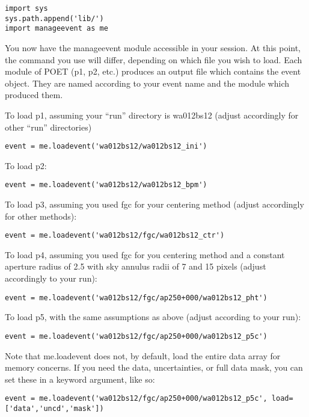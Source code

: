 \documentclass[letterpaper,12pt]{article}
\begin{document}
\begin{verbatim}
import sys
sys.path.append('lib/')
import manageevent as me
\end{verbatim}

You now have the manageevent module accessible in your session. At
this point, the command you use will differ, depending on which file
you wish to load. Each module of POET (p1, p2, etc.) produces an
output file which contains the event object. They are named according
to your event name and the module which produced them.

To load p1, assuming your ``run'' directory is wa012bs12 (adjust accordingly for other ``run'' directories)

\begin{verbatim}
event = me.loadevent('wa012bs12/wa012bs12_ini')
\end{verbatim}

To load p2:

\begin{verbatim}
event = me.loadevent('wa012bs12/wa012bs12_bpm')
\end{verbatim}

To load p3, assuming you used fgc for your centering method (adjust accordingly
for other methods):

\begin{verbatim}
event = me.loadevent('wa012bs12/fgc/wa012bs12_ctr')
\end{verbatim}

To load p4, assuming you used fgc for you centering method and a constant
aperture radius of 2.5 with sky annulus radii of 7 and 15 pixels (adjust
accordingly to your run):

\begin{verbatim}
event = me.loadevent('wa012bs12/fgc/ap250+000/wa012bs12_pht')
\end{verbatim}

To load p5, with the same assumptions as above (adjust according to your run):

\begin{verbatim}
event = me.loadevent('wa012bs12/fgc/ap250+000/wa012bs12_p5c')
\end{verbatim}

Note that me.loadevent does not, by default, load the entire data array
for memory concerns. If you need the data, uncertainties, or full
data mask, you can set these in a keyword argument, like so:

\begin{verbatim}
event = me.loadevent('wa012bs12/fgc/ap250+000/wa012bs12_p5c', load=['data','uncd','mask'])
\end{verbatim}
\end{document}
